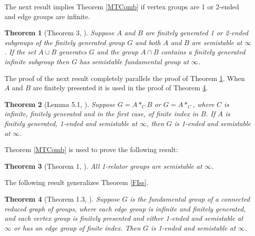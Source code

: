 \documentclass[12pt]{article}
\newtheorem{theorem}{Theorem}[subsection]
\begin{document}
The next result implies Theorem \ref{MTComb} if vertex groups are 1 or 2-ended and edge groups are infinite.  

\begin{theorem} [Theorem 3, \cite{M4}] \label{MComb} 
Suppose  $A$ and $B$ are finitely generated 1 or 2-ended subgroups of the finitely generated group $G$ and both $A$ and $B$ are semistable at $\infty$.  If the set $A\cup B$ generates $G$ and the group $A\cap B$ contains a finitely generated infinite subgroup then $G$ has semistable fundamental group at $\infty$. 
\end{theorem}

The proof of the next result completely parallels the proof of Theorem \ref{MComb}. When $A$ and $B$ are finitely presented it is used in the proof of Theorem \ref{SSDecomp}.

\begin{theorem} [Lemma 5.1, \cite{Mih22}] \label{SS2} 
Suppose $G=A\ast_CB$ or $G=A\ast_C$, where $C$ is infinite, finitely generated and in the first case, of finite index in $B$. If $A$ is finitely generated, 1-ended and semistable at $\infty$, then $G$ is 1-ended and semistable at $\infty$.
\end{theorem}
Theorem \ref{MTComb} is used to prove the following result:

\begin{theorem} [Theorem 1, \cite{MT92}] \label{OneR} 
All 1-relator groups are semistable at $\infty$.
\end{theorem}

The following result generalizes Theorem \ref{FIss}. 

\begin{theorem} [Theorem 1.3, \cite{Mih22}] \label{SSDecomp} 
Suppose $G$ is the fundamental group of a connected reduced graph of groups, where each edge group is infinite and finitely generated, and each vertex group is finitely presented and either 1-ended and semistable at $\infty$ or has an edge group of finite index. %
Then $G$ is 1-ended and semistable at $\infty$. 
\end{theorem}

\end{document}
